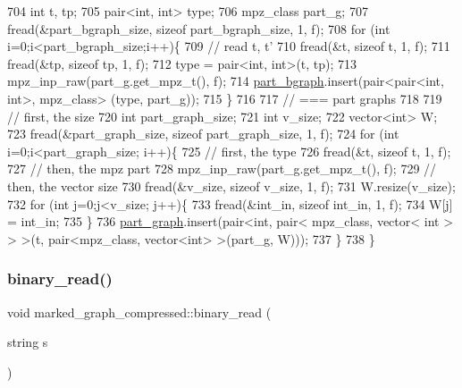 \begin{DoxyCode}
704   \textcolor{keywordtype}{int} t, tp;
705   pair<int, int> type; 
706   mpz\_class part\_g; 
707   fread(&part\_bgraph\_size, \textcolor{keyword}{sizeof} part\_bgraph\_size, 1, f);
708   \textcolor{keywordflow}{for} (\textcolor{keywordtype}{int} i=0;i<part\_bgraph\_size;i++)\{
709     \textcolor{comment}{// read t, t'}
710     fread(&t, \textcolor{keyword}{sizeof} t, 1, f);
711     fread(&tp, \textcolor{keyword}{sizeof} tp, 1, f);
712     type = pair<int, int>(t, tp);
713     mpz\_inp\_raw(part\_g.get\_mpz\_t(), f);
714     \hyperlink{classmarked__graph__compressed_a7b3267063fba30b45eb21b3ba4e07536}{part\_bgraph}.insert(pair<pair<int, int>, mpz\_class> (type, part\_g));
715   \}
716 
717   \textcolor{comment}{// === part graphs}
718 
719   \textcolor{comment}{// first, the size}
720   \textcolor{keywordtype}{int} part\_graph\_size;
721   \textcolor{keywordtype}{int} v\_size;
722   vector<int> W; 
723   fread(&part\_graph\_size, \textcolor{keyword}{sizeof} part\_graph\_size, 1, f);
724   \textcolor{keywordflow}{for} (\textcolor{keywordtype}{int} i=0;i<part\_graph\_size; i++)\{
725     \textcolor{comment}{// first, the type}
726     fread(&t, \textcolor{keyword}{sizeof} t, 1, f);
727     \textcolor{comment}{// then, the mpz part}
728     mpz\_inp\_raw(part\_g.get\_mpz\_t(), f);
729     \textcolor{comment}{// then, the vector size}
730     fread(&v\_size, \textcolor{keyword}{sizeof} v\_size, 1, f);
731     W.resize(v\_size);
732     \textcolor{keywordflow}{for} (\textcolor{keywordtype}{int} j=0;j<v\_size; j++)\{
733       fread(&int\_in, \textcolor{keyword}{sizeof} int\_in, 1, f);
734       W[j] = int\_in;
735     \}
736     \hyperlink{classmarked__graph__compressed_ae179a4737e6eab905c18a94d44ef64b7}{part\_graph}.insert(pair<\textcolor{keywordtype}{int}, pair< mpz\_class, vector< int > > >(t, pair<mpz\_class, vector<int>
       >(part\_g, W)));
737   \}
738 \}
\end{DoxyCode}
\mbox{\label{classmarked__graph__compressed_a01c67fe4234738db6bb60459515c3ad8}} 
\subsubsection{\texorpdfstring{binary\+\_\+read()}{binary\_read()}\hspace{0.1cm}{\footnotesize\ttfamily [2/2]}}
{\footnotesize\ttfamily void marked\+\_\+graph\+\_\+compressed\+::binary\+\_\+read (\begin{DoxyParamCaption}\item[{string}]{s }\end{DoxyParamCaption})}

